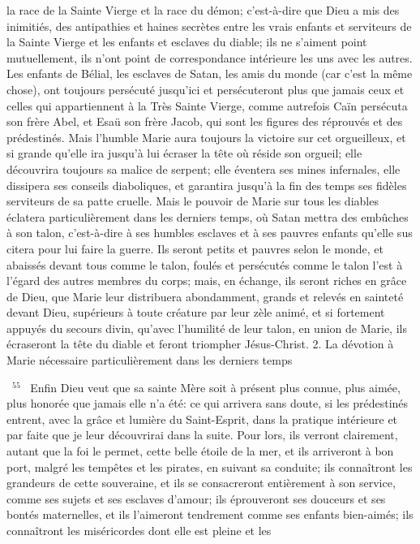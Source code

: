 \documentclass[paper=a5,pagesize=pdftex,fontsize=15pt,headinclude=on,twoside=off]{scrbook}
\newcommand{\negphantom}[1]{\settowidth{\dimen0}{#1}\hspace*{-\dimen0}}
\newcommand{\versenb}[1]{\par \vspace{10pt}~\negphantom{~${}^{#1}$~}${}^{#1}$~}
\begin{document}
la race de la Sainte Vierge et la race du démon; c'est-à-dire que Dieu a mis des inimitiés, des antipathies et haines
secrètes entre les vrais enfants et serviteurs de la Sainte Vierge et les enfants et esclaves du diable; ils ne
s'aiment point mutuellement, ils n'ont point de correspondance intérieure les uns avec les autres. Les enfants de
Bélial, les esclaves de Satan, les amis du monde (car c'est la même chose), ont toujours persécuté jusqu'ici et
persécuteront plus que jamais ceux et celles qui appartiennent à la Très Sainte Vierge, comme autrefois Caïn
persécuta son frère Abel, et Esaü son frère Jacob, qui sont les figures des réprouvés et des prédestinés. Mais
l'humble Marie aura toujours la victoire sur cet orgueilleux, et si grande qu'elle ira jusqu'à lui écraser la tête où
réside son orgueil; elle découvrira toujours sa malice de serpent; elle éventera ses mines infernales, elle dissipera
ses conseils diaboliques, et garantira jusqu'à la fin des temps ses fidèles serviteurs de sa patte cruelle.
Mais le pouvoir de Marie sur tous les diables éclatera particulièrement dans les derniers temps, où Satan mettra
des embûches à son talon, c'est-à-dire à ses humbles esclaves et à ses pauvres enfants qu'elle sus citera pour lui
faire la guerre. Ils seront petits et pauvres selon le monde, et abaissés devant tous comme le talon, foulés et
persécutés comme le talon l'est à l'égard des autres membres du corps; mais, en échange, ils seront riches en
grâce de Dieu, que Marie leur distribuera abondamment, grands et relevés en sainteté devant Dieu, supérieurs à
toute créature par leur zèle animé, et si fortement appuyés du secours divin, qu'avec l'humilité de leur talon, en
union de Marie, ils écraseront la tête du diable et feront triompher Jésus-Christ.
2. La dévotion à Marie nécessaire
particulièrement dans les derniers temps
\versenb{55} Enfin Dieu veut que sa sainte Mère soit à présent plus connue, plus aimée, plus honorée que jamais elle n'a
été: ce qui arrivera sans doute, si les prédestinés entrent, avec la grâce et lumière du Saint-Esprit, dans la pratique
intérieure et par faite que je leur découvrirai dans la suite. Pour lors, ils verront clairement, autant que la foi le
permet, cette belle étoile de la mer, et ils arriveront à bon port, malgré les tempêtes et les pirates, en suivant sa
conduite; ils connaîtront les grandeurs de cette souveraine, et ils se consacreront entièrement à son service,
comme ses sujets et ses esclaves d'amour; ils éprouveront ses douceurs et ses bontés maternelles, et ils
l'aimeront tendrement comme ses enfants bien-aimés; ils connaîtront les miséricordes dont elle est pleine et les
\end{document}
